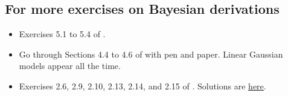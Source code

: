 \documentclass{article}
\newif\ifsolutions
\newcommand\solution[1]{
\ifsolutions
\begin{mdframed}[style=MyFrame]
\textcolor{bleu}{\textbf{Solution:} #1}
\end{mdframed}
\fi
}
\begin{document}
\solution{
We write Bayes' theorem and keep track only of the terms that won't end up in the normalization constant. This gives
\begin{align*}
\log p(\theta\vert y_{1:N}, x_{1:N}) &\propto \log p(y_{1:N}\vert x_{1:N},\theta) + \log p(\theta)\\
& \propto -\sum_{i=1}^N \frac{(y_i-x_i^T\theta)^2}{2\sigma^2} + \frac{1}{2\sigma_0^2}\Vert \theta\Vert^2\\
&= - \frac{1}{2\sigma^2}\Vert y-X\theta\Vert^2 + \frac{1}{2\sigma_0^2}\Vert \theta\Vert^2\\
&\propto - \frac{1}{2\sigma^2} \left[\theta^T \left(X^TX + \frac{\sigma^2}{\sigma_0^2}I_d\right) \theta - 2y^T X\theta\right]\\
&= -\frac12 \left[\theta^T \Lambda \theta - \frac{2}{\sigma^2}y^T X\theta\right],
\end{align*}
where $\Lambda:=\frac{1}{\sigma^2} X^TX + \frac{1}{\sigma_0^2}I_d$ is symmetric and positive definite. This leads to
$$
\log p(\theta\vert y_{1:N}, x_{1:N}) \propto -\frac12 \left(\theta-\frac{1}{\sigma^2}\Lambda^{-1} X^Ty\right)^T \Lambda \left(\theta-\frac{1}{\sigma^2}\Lambda^{-1}X^Ty\right),
$$
so that $\theta\vert y_{1:N}, x_{1:N}$ is indeed Gaussian, with mean the ridge regression estimator
$$ \frac{1}{\sigma^2}\Lambda^{-1}X^Ty = \left( X^TX + \frac{\sigma^2}{\sigma_0^2}I_d\right)^{-1} X^Ty
$$
and variance $\Lambda^{-1}$. Note how the ratio $\sigma/\sigma_0$ is playing the role of the regularization parameter in ridge regression.
}

 \subsection{For more exercises on Bayesian derivations}
 \begin{itemize}
   \item Exercises 5.1 to 5.4 of \citep{Mur12}.
   \item Go through Sections 4.4 to 4.6 of \citep{Mur12} with pen and paper. Linear Gaussian models appear all the time.
   \item Exercises 2.6, 2.9, 2.10, 2.13, 2.14, and 2.15 of \citep{MaRo07}. Solutions are \href{https://arxiv.org/abs/0910.4696}{here}.
 \end{itemize}



\end{document}
